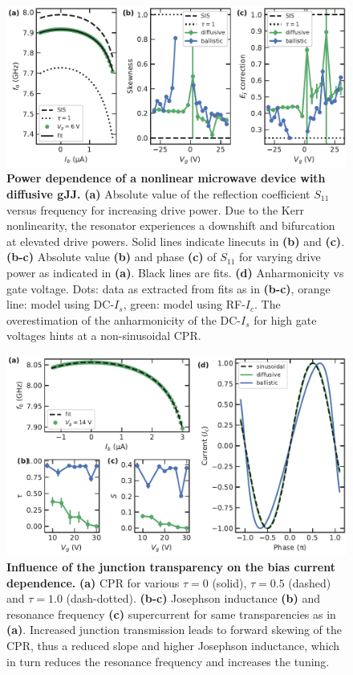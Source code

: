 \begin{figure}
	\centering
	\includegraphics[width=\linewidth]{chapter-gJJ-CPR/figs/Figure4}
	\caption{
	\textbf{Power dependence of a nonlinear microwave device with diffusive gJJ.}
	\textbf{(a)} Absolute value of the reflection coefficient $S_{11}$ versus frequency for increasing drive power.
	Due to the Kerr
nonlinearity, the resonator experiences a downshift and bifurcation at elevated drive powers.
	Solid
lines indicate linecuts in \textbf{(b)} and \textbf{(c)}.
	\textbf{(b-c)} Absolute value \textbf{(b)} and phase \textbf{(c)} of $S_{11}$ for varying drive power as indicated in \textbf{(a)}.
	Black lines
are fits.
	\textbf{(d)} Anharmonicity vs gate voltage.
	Dots: data as extracted from fits as in \textbf{(b-c)}, orange line: model
using DC-$I_s$, green: model using RF-$I_c$.
	The overestimation of the anharmonicity of the DC-$I_s$ for high
gate voltages hints at a non-sinusoidal CPR.}
	\label{fig:figure4}
\end{figure}
\begin{figure}
	\centering
	\includegraphics[width=\linewidth]{chapter-gJJ-CPR/figs/Figure5}
	\caption{
	\textbf{Influence of the junction transparency on the bias current dependence.}
	\textbf{(a)} CPR for various $\tau=0$ (solid), $\tau=0.5$ (dashed) and $\tau=1.0$	(dash-dotted).
	\textbf{(b-c)} Josephson inductance \textbf{(b)} and resonance frequency \textbf{(c)} supercurrent for	same transparencies as in \textbf{(a)}.
	Increased junction transmission leads to forward skewing of the CPR, thus a
reduced slope and higher Josephson inductance, which in turn reduces the
resonance frequency and increases the tuning.}
	\label{fig:figure5}
\end{figure}
